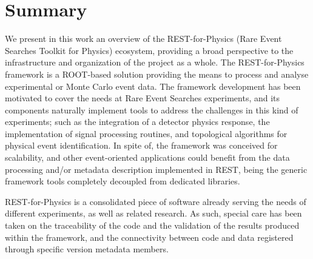 \section{Summary}





We present in this work an overview of the REST-for-Physics (Rare Event Searches Toolkit for Physics) ecosystem, providing a broad perspective to the infrastructure and organization of the project as a whole. The REST-for-Physics framework is a ROOT-based solution providing the means to process and analyse experimental or Monte Carlo event data. The framework development has been motivated to cover the needs at Rare Event Searches experiments, and its components naturally implement tools to address the challenges in this kind of experiments; such as the integration of a detector physics response, the implementation of signal processing routines, and topological algorithms for physical event identification. In spite of, the framework was conceived for scalability, and other event-oriented applications could benefit from the data processing and/or metadata description implemented in REST, being the generic framework tools completely decoupled from dedicated libraries.

REST-for-Physics is a consolidated piece of software already serving the needs of different experiments, as well as related research. As such, special care has been taken on the traceability of the code and the validation of the results produced within the framework, and the connectivity between code and data registered through specific version metadata members.
